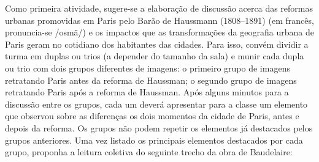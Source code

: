 \documentclass[12pt]{extarticle}
\begin{document}
Como primeira atividade, sugere-se a elaboração de discussão acerca das reformas urbanas promovidas em Paris pelo Barão de Haussmann (1808--1891)
(em francês, pronuncia-se /osmã/) e os impactos que as transformações da geografia urbana de Paris geram no cotidiano dos habitantes das cidades. Para isso, convém dividir a turma em duplas ou trios (a depender do tamanho da sala) e munir cada dupla ou trio com dois grupos diferentes de imagens: o primeiro grupo de imagens retratando Paris antes da reforma de Haussman; o segundo grupo de imagens retratando Paris após a reforma de Haussman. Após alguns minutos para a discussão entre os grupos, cada um deverá apresentar para a classe um elemento que observou sobre as diferenças os dois momentos da cidade de Paris, antes e depois da reforma. Os grupos não podem repetir os elementos já destacados pelos grupos anteriores. Uma vez listado os principais elementos destacados por cada grupo, proponha a leitura coletiva do seguinte trecho da obra de Baudelaire:
\end{document}
